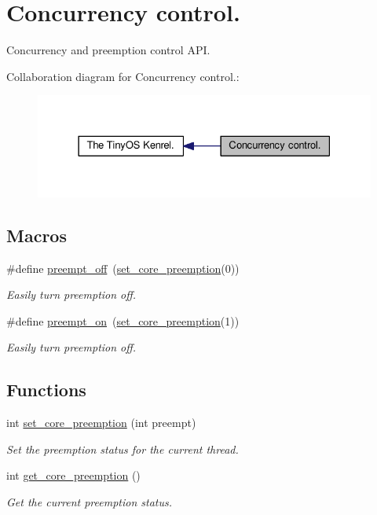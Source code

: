 \hypertarget{group__cc}{\section{Concurrency control.}
\label{group__cc}
}


Concurrency and preemption control A\-P\-I.  


Collaboration diagram for Concurrency control.\-:
\nopagebreak
\begin{figure}[H]
\begin{center}
\leavevmode
\includegraphics[width=328pt]{group__cc}
\end{center}
\end{figure}
\subsection*{Macros}
\begin{DoxyCompactItemize}
\item 
\#define \hyperlink{group__cc_gaf936bcf607a61848cfea21c119f30905}{preempt\-\_\-off}~(\hyperlink{group__cc_ga6121802a0b64aae83288f60bf8a76834}{set\-\_\-core\-\_\-preemption}(0))
\begin{DoxyCompactList}\small\item\em Easily turn preemption off. \end{DoxyCompactList}\item 
\#define \hyperlink{group__cc_gac8efed506a60c7c6f02514e878a4004b}{preempt\-\_\-on}~(\hyperlink{group__cc_ga6121802a0b64aae83288f60bf8a76834}{set\-\_\-core\-\_\-preemption}(1))
\begin{DoxyCompactList}\small\item\em Easily turn preemption off. \end{DoxyCompactList}\end{DoxyCompactItemize}
\subsection*{Functions}
\begin{DoxyCompactItemize}
\item 
int \hyperlink{group__cc_ga6121802a0b64aae83288f60bf8a76834}{set\-\_\-core\-\_\-preemption} (int preempt)
\begin{DoxyCompactList}\small\item\em Set the preemption status for the current thread. \end{DoxyCompactList}\item 
int \hyperlink{group__cc_gac3fd575c0f82fd75f8e7305be1107e2c}{get\-\_\-core\-\_\-preemption} ()
\begin{DoxyCompactList}\small\item\em Get the current preemption status. \end{DoxyCompactList}\end{DoxyCompactItemize}
